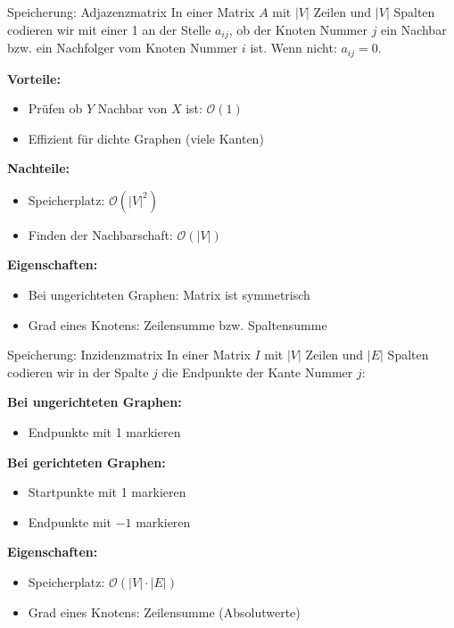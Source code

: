 \documentclass[a4paper, fontsize=7pt]{scrartcl}
\begin{document}
\begin{mainbox}{Speicherung: Adjazenzmatrix}
In einer Matrix $A$ mit $|V|$ Zeilen und $|V|$ Spalten codieren wir mit einer 1 an der Stelle $a_{ij}$, ob der Knoten Nummer $j$ ein Nachbar bzw. ein Nachfolger vom Knoten Nummer $i$ ist. Wenn nicht: $a_{ij} = 0$.

\textbf{Vorteile:}
\begin{itemize}
    \item Pr\"ufen ob $Y$ Nachbar von $X$ ist: $\mathcal{O}(1)$
    \item Effizient f\"ur dichte Graphen (viele Kanten)
\end{itemize}

\textbf{Nachteile:}
\begin{itemize}
    \item Speicherplatz: $\mathcal{O}(|V|^2)$
    \item Finden der Nachbarschaft: $\mathcal{O}(|V|)$
\end{itemize}

\textbf{Eigenschaften:}
\begin{itemize}
    \item Bei ungerichteten Graphen: Matrix ist symmetrisch
    \item Grad eines Knotens: Zeilensumme bzw. Spaltensumme
\end{itemize}
\end{mainbox}

\begin{mainbox}{Speicherung: Inzidenzmatrix}
In einer Matrix $I$ mit $|V|$ Zeilen und $|E|$ Spalten codieren wir in der Spalte $j$ die Endpunkte der Kante Nummer $j$:

\textbf{Bei ungerichteten Graphen:}
\begin{itemize}
    \item Endpunkte mit 1 markieren
\end{itemize}

\textbf{Bei gerichteten Graphen:}
\begin{itemize}
    \item Startpunkte mit 1 markieren
    \item Endpunkte mit $-1$ markieren
\end{itemize}

\textbf{Eigenschaften:}
\begin{itemize}
    \item Speicherplatz: $\mathcal{O}(|V| \cdot |E|)$
    \item Grad eines Knotens: Zeilensumme (Absolutwerte)
\end{itemize}
\end{mainbox}
\end{document}
